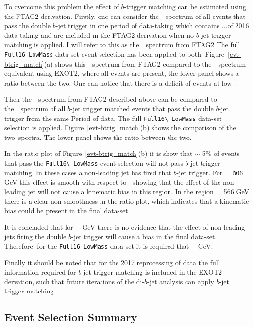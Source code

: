 To overcome this problem the effect of $b$-trigger matching can be estimated using the FTAG2 derivation.
Firstly, one can consider the~\mjj~spectrum of all events that pass the double $b$-jet trigger in
one period of data-taking which contains ...\ifb  of 2016 data-taking and
are included in the FTAG2 derivation when no $b$-jet trigger matching is applied.
I will refer to this as the~\mjj~spectrum from FTAG2
The full \verb|Full16_LowMass| data-set event selection has been applied to both.
Figure~\ref{evt-btrig_match}(a) shows this~\mjj~spectrum from FTAG2
compared to the~\mjj~spectrum equivalent using EXOT2, where all events are present,
the lower panel shows a ratio between the two.
One can notice that there is a deficit of events at low~\mjj.

Then the~\mjj~spectrum from FTAG2 described above can be compared to the~\mjj~spectrum of
all $b$-jet trigger matched events that pass the double $b$-jet trigger from the same Period of data.
The full \verb|Full16\_LowMass| data-set selection is applied.
Figure~\ref{evt-btrig_match}(b) shows the comparison of the two~\mjj spectra.
The lower panel shows the ratio between the two.

In the ratio plot of Figure~\ref{evt-btrig_match}(b) it is show that $\sim$ 5\% of events that
pass the \verb|Full16\_LowMass| event selection will not pass $b$-jet trigger matching.
In these cases a non-leading jet has fired that $b$-jet trigger.
For~\mjj~\gt~566 GeV this effect is smooth with respect to~\mjj~showing
that the effect of the non-leading jet will not cause a kinematic bias in this region.
In the region~\mjj~\lt~566 GeV there is a clear non-smoothness in the ratio plot,
which indicates that a kinematic bias could be present in the final data-set.

It is concluded that for~\mjj~ GeV there is no evidence that
the effect of non-leading jets firing the double $b$-jet trigger
will cause a bias in the final data-set.
Therefore, for the \verb|Full16_LowMass| data-set it is required that~\mjj~ GeV.

Finally it should be noted that for the 2017 reprocessing of data
the full information required for $b$-jet trigger matching is included in the EXOT2 dervation,
such that future iterations of the di-$b$-jet analysis can apply $b$-jet trigger matching.

\subsection{Event Selection Summary}
\label{sec:evt-sel-acc}

